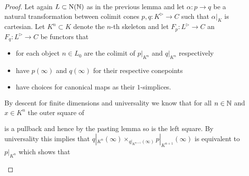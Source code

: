 \begin{lemma}
\begin{proof}
        Let again $L\subset\operatorname{N}(\mathbb{N})$ as in the previous lemma and let $\alpha\colon p\to q$ be a natural transformation between colimit cones $p,q\colon K^{\rhd}\to C$ such that $\alpha|_K$ is cartesian.
        Let $K^n\subset K$ denote the $n$-th skeleton and let $F_p\colon L^{\rhd}\to C$ an $F_q\colon L^{\rhd}\to C$ be functors that 
        \begin{itemize}
            \item for each object $n\in L_0$ are the colimit of $p|_{K^n}$ and $q|_{K^n}$ respectively 
            \item have $p(\infty)$ and $q(\infty)$ for their respective conepoints
            \item have choices for canonical maps as their $1$-simplices.
        \end{itemize}
        By descent for finite dimensions and universality we know that for all $n\in\mathbb{N}$ and $x\in K^n$ the outer square of
        \begin{center}
        \end{center}
        is a pullback and hence by the pasting lemma so is the left square.
        By universality this implies that $q|_{K^n}(\infty)\times_{q|_{K^{n+1}}(\infty)}p|_{K^{n+1}}(\infty)$ is equivalent to $p|_{K^n}$ which shows that
        \begin{center}
\end{center}
\end{proof}
\end{lemma}

